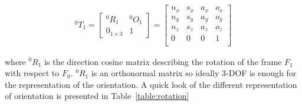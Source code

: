 \begin{align*}
^{0}T_1 = \begin{bmatrix}
^{0}R_1 & ^{0}O_1 \\
0_{1\times 3} & 1
\end{bmatrix}
=
\begin{bmatrix}
n_x & s_x & a_x & o_x \\
n_y & s_y & a_y & o_y \\
n_z & s_z & a_z & o_z \\
0 & 0 & 0 & 1 \\
\end{bmatrix}
\end{align*}


where $^{0}R_1$ is the direction cosine matrix describing the rotation of the frame $F_1$ with respect to $F_0$. $^{0}R_1$ is an orthonormal matrix so ideally 3-DOF is enough for the representation of the orientation. A quick look of the different representation of orientation is presented in Table~\ref{table:rotation} 

\begin{table}

\end{table}